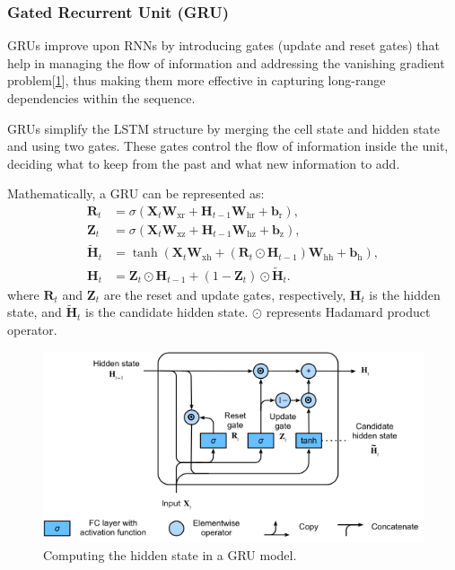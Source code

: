 \documentclass[10pt,twocolumn,letterpaper]{article}
\begin{document}
\subsubsection{Gated Recurrent Unit (GRU)}
\label{sec:gru}
GRUs improve upon RNNs by introducing gates (update and reset gates) that help in managing the flow of information and addressing the vanishing gradient problem\cite{cho2014learning}[\ref{fig:gru}], thus making them more effective in capturing long-range dependencies within the sequence.

GRUs simplify the LSTM structure by merging the cell state and hidden state and using two gates. These gates control the flow of information inside the unit, deciding what to keep from the past and what new information to add.

Mathematically, a GRU can be represented as:
\begin{align*}
	\mathbf{R}_t &= \sigma(\mathbf{X}_t \mathbf{W}_{\textrm{xr}} + \mathbf{H}_{t-1} \mathbf{W}_{\textrm{hr}} + \mathbf{b}_\textrm{r}),\\
	\mathbf{Z}_t &= \sigma(\mathbf{X}_t \mathbf{W}_{\textrm{xz}} + \mathbf{H}_{t-1} \mathbf{W}_{\textrm{hz}} + \mathbf{b}_\textrm{z}),	\\
	\tilde{\mathbf{H}}_t &= \tanh(\mathbf{X}_t \mathbf{W}_{\textrm{xh}} + \left(\mathbf{R}_t \odot \mathbf{H}_{t-1}\right) \mathbf{W}_{\textrm{hh}} + \mathbf{b}_\textrm{h}),\\
	\mathbf{H}_t &= \mathbf{Z}_t \odot \mathbf{H}_{t-1}  + (1 - \mathbf{Z}_t) \odot \tilde{\mathbf{H}}_t.	
\end{align*}
where \( \mathbf{R}_t \) and \( \mathbf{Z}_t \) are the reset and update gates, respectively, \( \mathbf{H}_t \) is the hidden state, and \( \tilde{\mathbf{H}}_t \) is the candidate hidden state. \( \odot \) represents Hadamard product operator.
\begin{figure}[h]
	\centering
	\includegraphics[width=\columnwidth]{gru}
	\caption{Computing the hidden state in a GRU model\cite{zhang2023dive}.}
	\label{fig:gru}
\end{figure}
\end{document}
